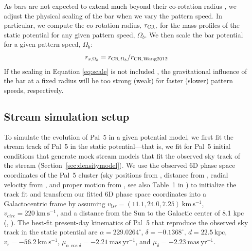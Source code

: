 \documentclass[twocolumn]{aastex62}
\newcommand{\kpc}{\textrm{kpc}}
\newcommand{\kms}{\ensuremath{\textrm{km}~\textrm{s}^{-1}}}
\newcommand{\masyr}{\ensuremath{\textrm{mas}~\textrm{yr}^{-1}}}
\begin{document}
As bars are not expected to extend much beyond their co-rotation radius \citep[e.g.,][]{weiner:1999, Debattista:2002, Debattista:2002b}, we adjust the physical scaling of the bar when we vary the pattern speed.
In particular, we compute the co-rotation radius, $r_{\rm CR}$, for the mass profiles of the static potential for any given pattern speed, $\Omega_b$.
We then scale the bar potential for a given pattern speed, $\Omega_b$:
\begin{equation}\label{eq:scale}
r_{s, \Omega_b}  = r_{{\rm CR}, \Omega_b}/r_{{\rm CR, Wang 2012}}
\end{equation}
If the scaling in Equation \ref{eq:scale} is not included \citep[as in, e.g.,][]{Pearson:2017, Erkal:2017, Banik:2019}, the gravitational influence of the bar at a fixed radius will be too strong (weak) for faster (slower) pattern speeds, respectively.

\subsection{Stream simulation setup}
\label{sec:modeling}

To simulate the evolution of Pal~5 in a given potential model, we first fit the stream track of Pal~5 in the static potential---that is, we fit for Pal~5 initial conditions that generate mock stream models that fit the observed sky track of the stream (Section~\ref{sec:densitymodel}).
We use the observed 6D phase space coordinates of the Pal~5 cluster (sky positions from \citealt{Odenkirchen:2002}, distance from \citealt{Harris:2010}, radial velocity from \citealt{Kuzma:2015}, and proper motion from \citealt{Fritz:2015}, see also Table~1 in \citealt{Pearson:2017}) to initialize the track fit and transform our fitted 6D phase space coordinates into a Galactocentric frame by assuming $v_{lsr} = (11.1, 24.0, 7.25) ~\kms$,  $v_{circ} = 220~\kms$, and a distance from the Sun to the Galactic center of 8.1 kpc (\citealt{Schonrich:2010}, \citealt{Schonrich:2012}).
The best-fit present-day kinematics of Pal~5 that reproduce the observed sky track in the static potential are $\alpha = 229.0264^\circ$, $\delta = -0.1368^\circ$, $d = 22.5~\kpc$, $v_r = -56.2~\kms$, $\mu_{\alpha\,\cos\delta} = -2.21~\masyr$, and $\mu_\delta = -2.23~\masyr$.
\end{document}
